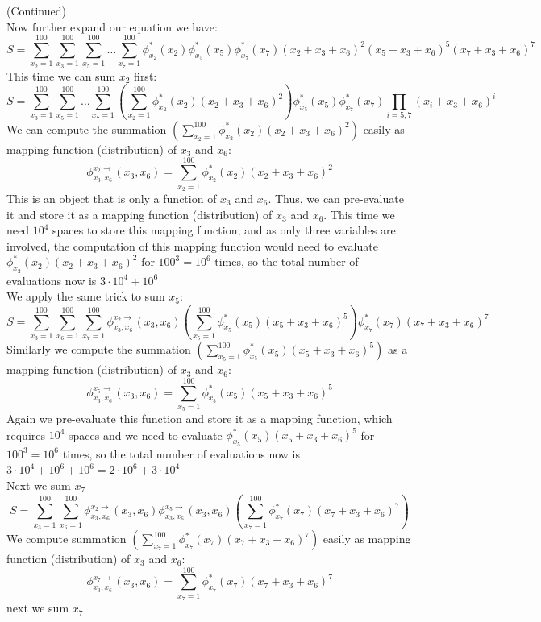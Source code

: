 \documentclass[11pt]{article}
\begin{document}
\begin{answertext}{24cm}{}
(Continued)\\
Now further expand our equation we have:
$$S = \sum^{100}_{x_2 = 1} \sum^{100}_{x_3 = 1}\sum^{100}_{x_5 = 1}\dots\sum^{100}_{x_7 = 1}\phi^*_{x_2}(x_2) \phi^*_{x_5}(x_5) \phi^*_{x_7}(x_7)  (x_2 + x_3 + x_6)^2 (x_5 + x_3 + x_6)^5 (x_7 + x_3 + x_6)^7$$
This time we can sum $x_2$ first:
$$S = \sum^{100}_{x_3 = 1}\sum^{100}_{x_5 = 1}\dots\sum^{100}_{x_7 = 1}\left(\sum^{100}_{x_2 = 1} \phi^*_{x_2}(x_2) (x_2 + x_3 + x_6)^2 \right) \phi^*_{x_5}(x_5) \phi^*_{x_7}(x_7)  \prod_{i=5,7} (x_i + x_3 + x_6)^i$$
We can compute the summation $\left(\sum^{100}_{x_2 = 1} \phi^*_{x_2}(x_2) (x_2 + x_3 + x_6)^2 \right)$ easily as mapping function (distribution) of $x_3$ and $x_6$:
$$\phi^{x_2\rightarrow}_{x_3,x_6}(x_3,x_6)= \sum^{100}_{x_2 = 1} \phi^*_{x_2}(x_2) (x_2 + x_3 + x_6)^2 $$
This is an object that is only a function of $x_3$ and $x_6$. Thus, we can pre-evaluate it and store it as a mapping function (distribution) of $x_3$ and $x_6$. This time we need $10^4$ spaces to store this mapping function, and as only three variables are involved, the computation of this mapping function would need to evaluate $\phi^*_{x_2}(x_2) (x_2 + x_3 + x_6)^2$ for $100^3=10^6$ times, so the total number of evaluations now is $3\cdot 10^4 + 10^6$\\
We apply the same trick to sum $x_5$:
$$S = \sum^{100}_{x_3 = 1}\sum^{100}_{x_6 = 1}\sum^{100}_{x_7 = 1}\phi^{x_2\rightarrow}_{x_3,x_6}(x_3,x_6)\left(\sum^{100}_{x_5 = 1} \phi^*_{x_5}(x_5) (x_5 + x_3 + x_6)^5 \right) \phi^*_{x_7}(x_7) (x_7 + x_3 + x_6)^7$$
Similarly we compute the summation $\left(\sum^{100}_{x_5 = 1} \phi^*_{x_5}(x_5) (x_5 + x_3 + x_6)^5 \right)$ as a mapping function (distribution) of $x_3$ and $x_6$:
$$\phi^{x_5\rightarrow}_{x_3,x_6}(x_3,x_6)= \sum^{100}_{x_5 = 1} \phi^*_{x_5}(x_5) (x_5 + x_3 + x_6)^5 $$
Again we pre-evaluate this function and store it as a mapping function, which requires $10^4$ spaces and we need to evaluate $\phi^*_{x_5}(x_5) (x_5 + x_3 + x_6)^5$ for $100^3=10^6$ times, so the total number of evaluations now is $3\cdot 10^4 + 10^6 + 10^6= 2\cdot 10^6 + 3\cdot 10^4$\\
Next we sum $x_7$
$$S = \sum^{100}_{x_3 = 1}\sum^{100}_{x_6 = 1}\phi^{x_2\rightarrow}_{x_3,x_6}(x_3,x_6) \phi^{x_5\rightarrow}_{x_3,x_6}(x_3,x_6) \left(\sum^{100}_{x_7 = 1} \phi^*_{x_7}(x_7) (x_7 + x_3 + x_6)^7 \right)$$
We compute summation $\left(\sum^{100}_{x_7 = 1} \phi^*_{x_7}(x_7) (x_7 + x_3 + x_6)^7 \right)$ easily as mapping function (distribution) of $x_3$ and $x_6$:
$$\phi^{x_7\rightarrow}_{x_3,x_6}(x_3,x_6)= \sum^{100}_{x_7 = 1} \phi^*_{x_7}(x_7) (x_7 + x_3 + x_6)^7 $$
next we sum $x_7$

\end{answertext} 
\end{document}

